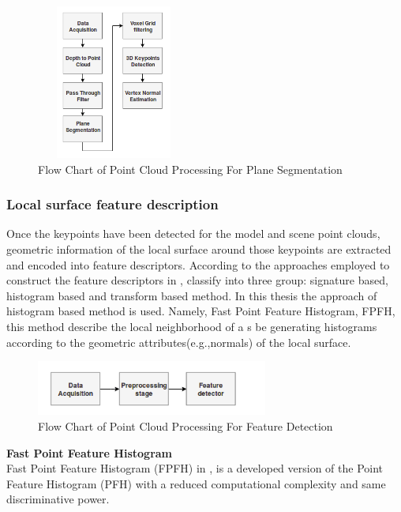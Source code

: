 \begin{figure}[!h]
\begin{center}
\includegraphics[width=2in,height=2in]{diagrams/vertexnormal.png}
\caption{Flow Chart of Point Cloud Processing For Plane Segmentation}
\label{fig:planesegmentation}
\end{center}
\end{figure}
\subsubsection{Local surface feature description}

Once the keypoints have been detected for the model and scene point clouds, geometric information of the local surface around those keypoints are extracted and encoded into feature descriptors. According to the approaches employed to construct the feature descriptors in \cite{survey}, classify into three group: signature based, histogram based and transform based method. In this thesis the approach of histogram based method is used. Namely, Fast Point Feature Histogram, FPFH, this method describe the local neighborhood of a s be generating histograms according to the geometric attributes(e.g.,normals) of the local surface.

\begin{figure}[!h]
\begin{center}
\includegraphics[width=3in]{diagrams/fpfh.png}
\caption{Flow Chart of Point Cloud Processing For Feature Detection}
\label{fig:fpfh}
\end{center}
\end{figure}

\noindent
\textbf{Fast Point Feature Histogram}\\
Fast Point Feature Histogram (FPFH) in \cite{algFpfh}, is a developed version of the Point Feature Histogram (PFH) \cite{algFpfh} with a reduced computational complexity and same discriminative power. 

